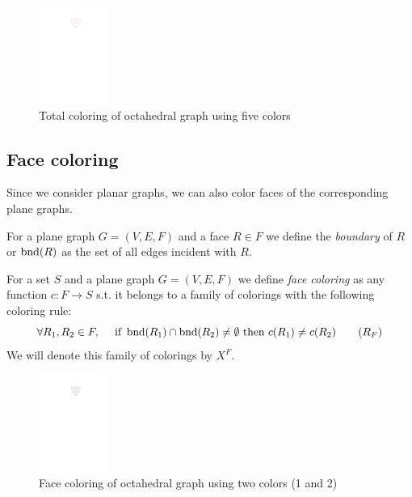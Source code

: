\begin{figure}[H]
    \centering
    \includegraphics[width=0.2\textwidth]{../Resources/Figs/octahedral_tot_colr.pdf}
    \caption{Total coloring of octahedral graph using five colors}
    \label{fig:octahedral_tot_coloring}
\end{figure}

\subsection{Face coloring}

Since we consider planar graphs, we can also color faces of the corresponding plane graphs.

\begin{defn}[boundary]
    For a plane graph $G=(V,E,F)$ and a face $R \in F$ we define the \emph{boundary} of $R$ or $\operatorname{bnd}(R)$ as the set of all edges incident with $R$.
\end{defn}

\begin{defn}
    For a set $S$ and a plane graph $G=(V,E,F)$ we define \emph{face coloring} as any function $c: F \rightarrow S$ s.t. it belongs to a family of colorings with the following coloring rule:
    \begin{equation}\label{eqn:face_rule}
     \forall R_1,R_2 \in F, \quad \text{ if } \operatorname{bnd}(R_1) \cap \operatorname{bnd}(R_2) \neq \emptyset \text{ then } c(R_1) \neq c(R_2) \tag{$R_F$}
    \end{equation}
    We will denote this family of colorings by $X^F$.
\end{defn}

\begin{figure}[H]
    \centering
    \includegraphics[width=0.2\textwidth]{../Resources/Figs/octahedral_face_colr.pdf}
    \caption{Face coloring of octahedral graph using two colors (1 and 2)}
    \label{fig:face_tot_coloring}
\end{figure}

